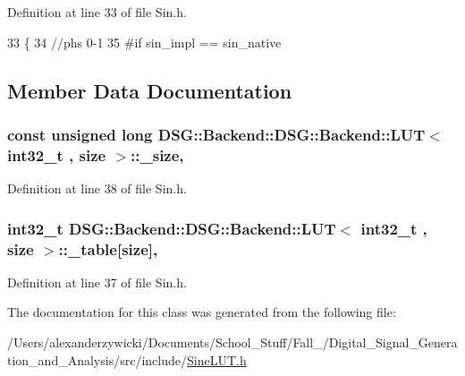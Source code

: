 Definition at line 33 of file Sin.\+h.


\begin{DoxyCode}
33                                         \{
34         \textcolor{comment}{//phs 0-1}
35 \textcolor{preprocessor}{#if sin\_impl == sin\_native}
\end{DoxyCode}


\subsection{Member Data Documentation}
\hypertarget{classDSG_1_1Backend_1_1DSG_1_1Backend_1_1LUT_aa48956aa4debf08fdb517cb751d3e01d}{
\subsubsection[{\+\_\+size}]{\setlength{\rightskip}{0pt plus 5cm}const unsigned long {\bf D\+S\+G\+::\+Backend\+::\+D\+S\+G\+::\+Backend\+::\+L\+U\+T}$<$ int32\+\_\+t , size $>$\+::\+\_\+size\hspace{0.3cm}{\ttfamily [protected]}, {\ttfamily [inherited]}}}\label{classDSG_1_1Backend_1_1DSG_1_1Backend_1_1LUT_aa48956aa4debf08fdb517cb751d3e01d}


Definition at line 38 of file Sin.\+h.

\hypertarget{classDSG_1_1Backend_1_1DSG_1_1Backend_1_1LUT_a427da4b7eccdfe25e3c1889a8c2fdea6}{
\subsubsection[{\+\_\+table}]{\setlength{\rightskip}{0pt plus 5cm}int32\+\_\+t  {\bf D\+S\+G\+::\+Backend\+::\+D\+S\+G\+::\+Backend\+::\+L\+U\+T}$<$ int32\+\_\+t , size $>$\+::\+\_\+table\mbox{[}size\mbox{]}\hspace{0.3cm}{\ttfamily [protected]}, {\ttfamily [inherited]}}}\label{classDSG_1_1Backend_1_1DSG_1_1Backend_1_1LUT_a427da4b7eccdfe25e3c1889a8c2fdea6}


Definition at line 37 of file Sin.\+h.



The documentation for this class was generated from the following file\+:\begin{DoxyCompactItemize}
\item 
/\+Users/alexanderzywicki/\+Documents/\+School\+\_\+\+Stuff/\+Fall\+\_/\+Digital\+\_\+\+Signal\+\_\+\+Generation\+\_\+and\+\_\+\+Analysis/src/include/\hyperlink{SineLUT_8h}{Sine\+L\+U\+T.\+h}\end{DoxyCompactItemize}
